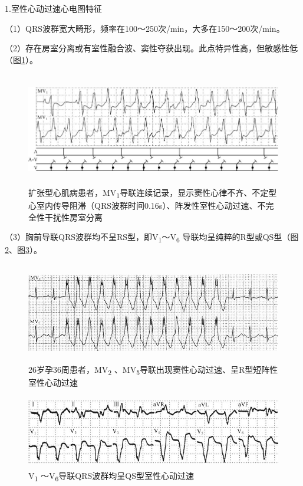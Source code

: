 1.室性心动过速心电图特征

（1）QRS波群宽大畸形，频率在100～250次/min，大多在150～200次/min。

（2）存在房室分离或有室性融合波、窦性夺获出现。此点特异性高，但敏感性低（图\ref{fig31-1}）。

\begin{figure}[!htbp]
 \centering
 \includegraphics[width=5.80208in,height=1.94792in]{./images/Image00504.jpg}
 \captionsetup{justification=centering}
 \caption{扩张型心肌病患者，MV\textsubscript{1}导联连续记录，显示窦性心律不齐、不定型心室内传导阻滞（QRS波群时间0.16s）、阵发性室性心动过速、不完全性干扰性房室分离}
 \label{fig31-1}
  \end{figure} 


（3）胸前导联QRS波群均不呈RS型，即V\textsubscript{1}～V\textsubscript{6} 导联均呈纯粹的R型或QS型（图\ref{fig31-2}、图\ref{fig31-3}）。

\begin{figure}[!htbp]
 \centering
 \includegraphics[width=5.58333in,height=1.70833in]{./images/Image00505.jpg}
 \captionsetup{justification=centering}
 \caption{26岁孕36周患者，MV\textsubscript{2} 、MV\textsubscript{5}导联出现窦性心动过速、呈R型短阵性室性心动过速}
 \label{fig31-2}
  \end{figure} 


\begin{figure}[!htbp]
 \centering
 \includegraphics[width=5in,height=1.25in]{./images/Image00506.jpg}
 \captionsetup{justification=centering}
 \caption{V\textsubscript{1} ～V\textsubscript{6}导联QRS波群均呈QS型室性心动过速}
 \label{fig31-3}
  \end{figure} 


